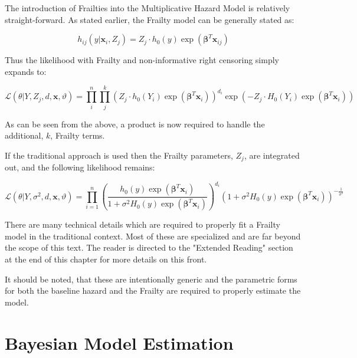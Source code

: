 The introduction of Frailties into the Multiplicative Hazard Model is relatively straight-forward. As stated earlier, the Frailty model can be generally stated as:

$$ h_{ij}(y|\textbf{x}_i, Z_j) = Z_j \cdot h_0(y) \exp(\boldsymbol\beta^T \textbf{x}_{ij})  $$

Thus the likelihood with Frailty and non-informative right censoring simply expands to:

$$ \mathcal {L}(\theta|Y, Z_j, d, \textbf{x}, \vartheta) = \prod^n_i \prod^k_j \left (Z_j \cdot h_0(Y_i) \exp(\boldsymbol\beta^T \textbf{x}_i)  \right )^{d_i} \exp(-Z_j \cdot H_0(Y_i) \exp(\boldsymbol\beta^T \textbf{x}_i)) $$

As can be seen from the above, a product is now required to handle the additional, $k$, Frailty terms. 

If the traditional approach is used then the Frailty parameters, $Z_j$, are integrated out, and the following likelihood remains:

$$ \mathcal {L}(\theta|Y, \sigma^2, d, \textbf{x}, \vartheta) = \prod_{i=1}^n \left (\frac{h_0(y) \exp(\boldsymbol\beta^T \textbf{x}_i)}{1+ \sigma^2 H_0(y) \exp(\boldsymbol\beta^T \textbf{x}_i)}  \right )^{d_i} (1+ \sigma^2 H_0(y) \exp(\boldsymbol\beta^T \textbf{x}_i))^{-\frac{1}{\sigma^2}} $$

There are many technical details which are required to properly fit a Frailty model in the traditional context. Most of these are specialized and are far beyond the scope of this text. The reader is directed to the "Extended Reading" section at the end of this chapter for more details on this front.

It should be noted, that these are intentionally generic and the parametric forms for both the baseline hazard and the Frailty are required to properly estimate the model.










\section*{Bayesian Model Estimation}

